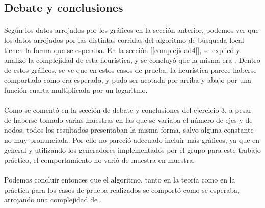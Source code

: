 \subsection{Debate y conclusiones}
\paragraph{}
Según los datos arrojados por los gráficos en la sección anterior, podemos ver que los datos arrojados por las distintas corridas del algoritmo de búsqueda local tienen la forma que se esperaba. En la sección [\ref{complejidad4}], se explicó y analizó la complejidad de esta heurística, y se concluyó que la misma era . Dentro de estos gráficos, se ve que en estos casos de prueba, la heurística parece haberse comportado como era esperado, y pudo ser acotada por arriba y abajo por una función cuarta multiplicada por un logaritmo.

\paragraph{}
Como se comentó en la sección de debate y conclusiones del ejercicio 3, a pesar de haberse tomado varias muestras en las que se variaba el número de ejes y de nodos, todos los resultados presentaban la misma forma, salvo alguna constante no muy pronunciada. Por ello no pareció adecuado incluir más gráficos, ya que en general y utilizando los generadores implementados por el grupo para este trabajo práctico, el comportamiento no varió de muestra en muestra.

\paragraph{}
Podemos concluir entonces que el algoritmo, tanto en la teoría como en la práctica para los casos de prueba realizados se comportó como se esperaba, arrojando una complejidad de .

